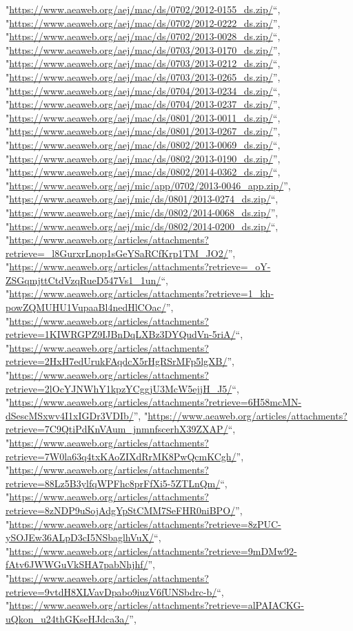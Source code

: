 \documentclass[]{article}
\begin{document}
\begin{itemize}
  "\url{https://www.aeaweb.org/aej/mac/ds/0702/2012-0155_ds.zip/}``,
  "\url{https://www.aeaweb.org/aej/mac/ds/0702/2012-0222_ds.zip/}'',
  "\url{https://www.aeaweb.org/aej/mac/ds/0702/2013-0028_ds.zip/}``,
  "\url{https://www.aeaweb.org/aej/mac/ds/0703/2013-0170_ds.zip/}'',
  "\url{https://www.aeaweb.org/aej/mac/ds/0703/2013-0212_ds.zip/}``,
  "\url{https://www.aeaweb.org/aej/mac/ds/0703/2013-0265_ds.zip/}'',
  "\url{https://www.aeaweb.org/aej/mac/ds/0704/2013-0234_ds.zip/}``,
  "\url{https://www.aeaweb.org/aej/mac/ds/0704/2013-0237_ds.zip/}'',
  "\url{https://www.aeaweb.org/aej/mac/ds/0801/2013-0011_ds.zip/}``,
  "\url{https://www.aeaweb.org/aej/mac/ds/0801/2013-0267_ds.zip/}'',
  "\url{https://www.aeaweb.org/aej/mac/ds/0802/2013-0069_ds.zip/}``,
  "\url{https://www.aeaweb.org/aej/mac/ds/0802/2013-0190_ds.zip/}'',
  "\url{https://www.aeaweb.org/aej/mac/ds/0802/2014-0362_ds.zip/}``,
  "\url{https://www.aeaweb.org/aej/mic/app/0702/2013-0046_app.zip/}'',
  "\url{https://www.aeaweb.org/aej/mic/ds/0801/2013-0274_ds.zip/}``,
  "\url{https://www.aeaweb.org/aej/mic/ds/0802/2014-0068_ds.zip/}'',
  "\url{https://www.aeaweb.org/aej/mic/ds/0802/2014-0200_ds.zip/}``,
  "\url{https://www.aeaweb.org/articles/attachments?retrieve=_l8GurxrLnop1sGeYSaRCfKrp1TM_JO2/}'',
  "\url{https://www.aeaweb.org/articles/attachments?retrieve=_oY-ZSGqmjttCtdVzqRueD547Vs1_1un/}``,
  "\url{https://www.aeaweb.org/articles/attachments?retrieve=1_kh-powZQMUHU1VupaaBl4nedHlCOac/}'',
  "\url{https://www.aeaweb.org/articles/attachments?retrieve=1KIWRGPZ9IJBnDqLXBz3DYQudVn-5riA/}``,
  "\url{https://www.aeaweb.org/articles/attachments?retrieve=2HxH7edUrukFAqdcX5rHgRSrMFp5lgXB/}'',
  "\url{https://www.aeaweb.org/articles/attachments?retrieve=2lOcYJNWhY1kpzYCggjU3McW5ejjH_J5/}``,
  "\url{https://www.aeaweb.org/articles/attachments?retrieve=6H58mcMN-dSescMSxwv4I1xIGDr3VDIb/}'',
  "\url{https://www.aeaweb.org/articles/attachments?retrieve=7C9QtiPdKnVAum_jnmnfscerhX39ZXAP/}``,
  "\url{https://www.aeaweb.org/articles/attachments?retrieve=7W0la63q4txKAoZIXdRrMK8PwQcmKCgh/}'',
  "\url{https://www.aeaweb.org/articles/attachments?retrieve=88Lz5B3ylfqWPFhc8prFfXi5-5ZTLnQm/}``,
  "\url{https://www.aeaweb.org/articles/attachments?retrieve=8zNDP9uSojAdgYpStCMM7SeFHR0niBPO/}'',
  "\url{https://www.aeaweb.org/articles/attachments?retrieve=8zPUC-ySOJEw36ALpD3cI5NSbaglhVuX/}``,
  "\url{https://www.aeaweb.org/articles/attachments?retrieve=9mDMw92-fAtv6JWWGuVkSHA7pabNhjhf/}'',
  "\url{https://www.aeaweb.org/articles/attachments?retrieve=9vtdH8XLVavDpabo9iuzV6fUNSbdrc-b/}``,
  "\url{https://www.aeaweb.org/articles/attachments?retrieve=alPAIACKG-uQkon_u24thGKseHJdca3a/}'',

\end{itemize}
\end{document}
